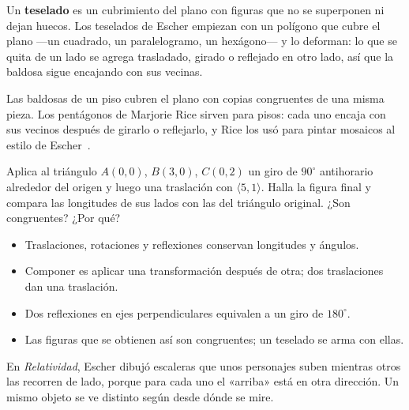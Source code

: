 \documentclass[11pt]{article}
\begin{document}
Un \textbf{teselado} es un cubrimiento del plano con figuras que no se superponen ni dejan huecos.
Los teselados de Escher empiezan con un polígono que cubre el plano ---un cuadrado, un
paralelogramo, un hexágono--- y lo deforman: lo que se quita de un lado se agrega trasladado,
girado o reflejado en otro lado, así que la baldosa sigue encajando con sus vecinas.

\begin{aplicacion}
Las baldosas de un piso cubren el plano con copias congruentes de una misma pieza. Los pentágonos
de Marjorie Rice sirven para pisos: cada uno encaja con sus vecinos después de girarlo o
reflejarlo, y Rice los usó para pintar mosaicos al estilo de Escher~\cite{quanta}.
\end{aplicacion}

\begin{preguntas}
\pregunta Aplica al triángulo $A(0, 0)$, $B(3, 0)$, $C(0, 2)$ un giro de $90^\circ$ antihorario
alrededor del origen y luego una traslación con $\langle 5, 1 \rangle$. Halla la figura final y
compara las longitudes de sus lados con las del triángulo original. ¿Son congruentes? ¿Por qué?
\espacio{4cm}
\end{preguntas}

\begin{resumen}
\begin{itemize}
  \item Traslaciones, rotaciones y reflexiones conservan longitudes y ángulos.
  \item Componer es aplicar una transformación después de otra; dos traslaciones dan una traslación.
  \item Dos reflexiones en ejes perpendiculares equivalen a un giro de $180^\circ$.
  \item Las figuras que se obtienen así son congruentes; un teselado se arma con ellas.
\end{itemize}
\end{resumen}

\label{tema:vistas}

\begin{hilo}
En \emph{Relatividad}, Escher dibujó escaleras que unos personajes suben mientras otros las
recorren de lado, porque para cada uno el «arriba» está en otra dirección. Un mismo objeto se ve
distinto según desde dónde se mire.
\end{hilo}
\end{document}
